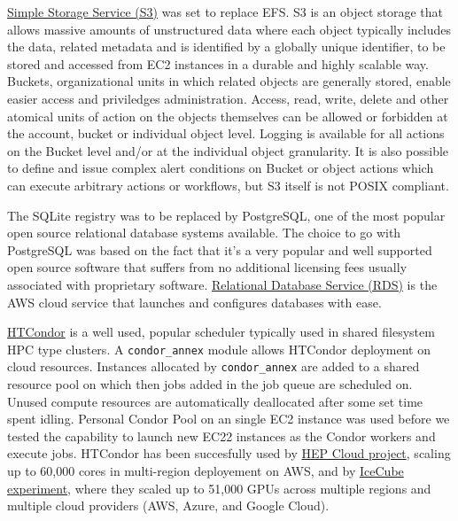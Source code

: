 \href{https://aws.amazon.com/s3/}{Simple Storage Service (S3)} was set to replace EFS. S3 is an object storage that allows massive amounts of unstructured data where each object typically includes the data, related metadata and is identified by a globally unique identifier, to be stored and accessed from EC2 instances in a durable and highly scalable way.
Buckets, organizational units in which related objects are generally stored, enable easier access and priviledges administration. Access, read, write, delete and other atomical units of action on the objects themselves can be allowed or forbidden at the account, bucket or individual object level. Logging is available for all actions on the Bucket level and/or at the individual object granularity. It is also possible to define and issue complex alert conditions on Bucket or object actions which can execute arbitrary actions or workflows, but S3 itself is not POSIX compliant.

The SQLite registry was to be replaced by PostgreSQL, one of the most popular open source relational database systems available. The choice to go with PostgreSQL was based on the fact that it's a very popular and well supported open source software that suffers from no additional licensing fees usually associated with proprietary software. \href{https://aws.amazon.com/rds/}{Relational Database Service (RDS)} is the AWS cloud service that launches and configures databases with ease. 

\href{https://research.cs.wisc.edu/htcondor}{HTCondor} is a well used, popular scheduler typically used in shared filesystem HPC type clusters. A \texttt{condor\_annex} module allows HTCondor deployment on cloud resources. Instances allocated by \texttt{condor\_annex} are added to a shared resource pool on which then jobs added in the job queue are scheduled on. Unused compute resources are automatically deallocated after some set time spent idling. Personal Condor Pool on an single EC2 instance was used before we tested the capability to launch new EC22 instances as the Condor workers and execute jobs. HTCondor has been succesfully used by \href{https://aws.amazon.com/blogs/aws/experiment-that-discovered-the-higgs-boson-uses-aws-to-probe-nature}{HEP Cloud project}, scaling up to 60,000 cores in multi-region deployement on AWS, and by \href{https://www.linkedin.com/pulse/using-50k-gpus-across-multiple-clouds-icecube-science-igor-sfiligoi}{IceCube experiment}, where they scaled up to 51,000 GPUs across multiple regions and multiple cloud providers (AWS, Azure, and Google Cloud).

